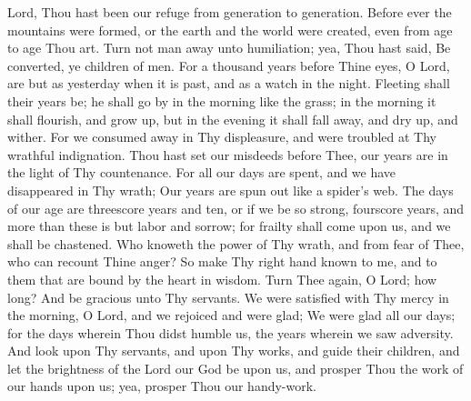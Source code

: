 Lord, Thou hast been our refuge from generation to generation. Before ever the mountains were formed, or the earth and the world were created, even from age to age Thou art. Turn not man away unto humiliation; yea, Thou hast said, Be converted, ye children of men. For a thousand years before Thine eyes, O Lord, are but as yesterday when it is past, and as a watch in the night. Fleeting shall their years be; he shall go by in the morning like the grass; in the morning it shall flourish, and grow up, but in the evening it shall fall away, and dry up, and wither. For we consumed away in Thy displeasure, and were troubled at Thy wrathful indignation. Thou hast set our misdeeds before Thee, our years are in the light of Thy countenance. For all our days are spent, and we have disappeared in Thy wrath; Our years are spun out like a spider’s web. The days of our age are threescore years and ten, or if we be so strong, fourscore years, and more than these is but labor and sorrow; for frailty shall come upon us, and we shall be chastened. Who knoweth the power of Thy wrath, and from fear of Thee, who can recount Thine anger? So make Thy right hand known to me, and to them that are bound by the heart in wisdom. Turn Thee again, O Lord; how long? And be gracious unto Thy servants. We were satisfied with Thy mercy in the morning, O Lord, and we rejoiced and were glad; We were glad all our days; for the days wherein Thou didst humble us, the years wherein we saw adversity. And look upon Thy servants, and upon Thy works, and guide their children, and let the brightness of the Lord our God be upon us, and prosper Thou the work of our hands upon us; yea, prosper Thou our handy-work.
